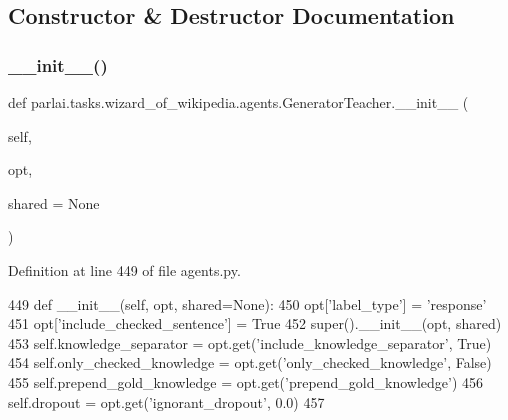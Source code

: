 \subsection{Constructor \& Destructor Documentation}
\mbox{\label{classparlai_1_1tasks_1_1wizard__of__wikipedia_1_1agents_1_1GeneratorTeacher_aebced34e7b98c204d1215e5898d16c8a}} 
\subsubsection{\texorpdfstring{\+\_\+\+\_\+init\+\_\+\+\_\+()}{\_\_init\_\_()}}
{\footnotesize\ttfamily def parlai.\+tasks.\+wizard\+\_\+of\+\_\+wikipedia.\+agents.\+Generator\+Teacher.\+\_\+\+\_\+init\+\_\+\+\_\+ (\begin{DoxyParamCaption}\item[{}]{self,  }\item[{}]{opt,  }\item[{}]{shared = {\ttfamily None} }\end{DoxyParamCaption})}



Definition at line 449 of file agents.\+py.


\begin{DoxyCode}
449     \textcolor{keyword}{def }\_\_init\_\_(self, opt, shared=None):
450         opt[\textcolor{stringliteral}{'label\_type'}] = \textcolor{stringliteral}{'response'}
451         opt[\textcolor{stringliteral}{'include\_checked\_sentence'}] = \textcolor{keyword}{True}
452         super().\_\_init\_\_(opt, shared)
453         self.knowledge\_separator = opt.get(\textcolor{stringliteral}{'include\_knowledge\_separator'}, \textcolor{keyword}{True})
454         self.only\_checked\_knowledge = opt.get(\textcolor{stringliteral}{'only\_checked\_knowledge'}, \textcolor{keyword}{False})
455         self.prepend\_gold\_knowledge = opt.get(\textcolor{stringliteral}{'prepend\_gold\_knowledge'})
456         self.dropout = opt.get(\textcolor{stringliteral}{'ignorant\_dropout'}, 0.0)
457 
\end{DoxyCode}


